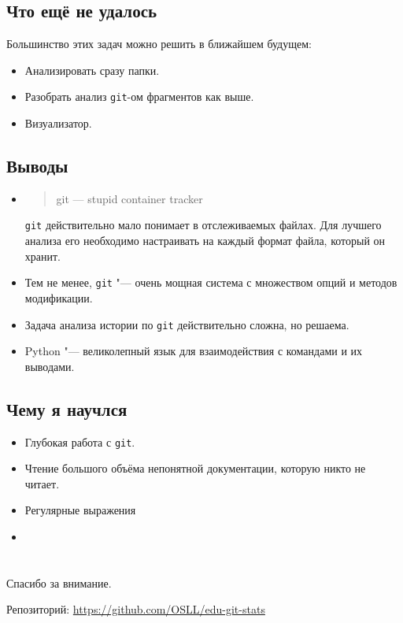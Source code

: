 \documentclass{beamer}
\makeatletter
\newcommand*{\currentname}{\@currentlabelname}
\def\t{\texttt}
\makeatother
\begin{document}
\subsection{Что ещё не удалось}

\begin{frame}[t]{\currentname}
	Большинство этих задач можно решить в ближайшем будущем:
	\pause
	\begin{itemize}
	\item
		Анализировать сразу папки.
		\pause
	\item
		Разобрать анализ \t{git}-ом фрагментов как выше.
		\pause
	\item
		Визуализатор.
	\end{itemize}
\end{frame}

\subsection{Выводы}

\begin{frame}[t]{\currentname}
	\pause
	\begin{itemize}
	\item
		\begin{quote}
			git --- stupid container tracker
		\end{quote}
		\t{git} действительно мало понимает в отслеживаемых файлах.
		Для лучшего анализа его необходимо настраивать на каждый формат файла, который он хранит.
		\pause
	\item
		Тем не менее, \t{git} "--- очень мощная система с множеством опций и методов модификации.
		\pause
	\item
		Задача анализа истории по \t{git} действительно сложна, но решаема.
		\pause
	\item
		Python "--- великолепный язык для взаимодействия с командами и их выводами.
	\end{itemize}
\end{frame}

\subsection{Чему я научлся}

\begin{frame}[t]{\currentname}
	\pause
	\begin{itemize}
	\item
		Глубокая работа с \t{git}.
		\pause
	\item
		Чтение большого объёма непонятной документации, которую никто не читает.
		\pause
	\item
		Регулярные выражения
		\pause
	\item

	\end{itemize}
\end{frame}

\section{}

\begin{frame}
	\begin{center}
		Спасибо за внимание.

		Репозиторий: \url{https://github.com/OSLL/edu-git-stats}
	\end{center}
\end{frame}
\end{document}
